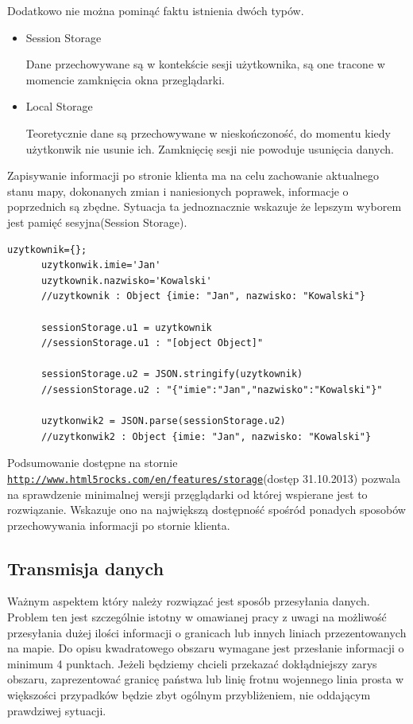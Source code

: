 Dodatkowo nie można pominąć faktu istnienia dwóch typów.
\begin{itemize}

\item
Session Storage

Dane przechowywane są w kontekście sesji użytkownika, są one tracone w momencie zamknięcia okna przeglądarki.

\item
Local Storage

Teoretycznie dane są przechowywane w nieskończoność, do momentu kiedy użytkonwik nie usunie ich. Zamknięcię sesji nie powoduje usunięcia danych.

\end{itemize}

Zapisywanie informacji po stronie klienta ma na celu zachowanie aktualnego stanu mapy, dokonanych zmian i naniesionych poprawek, informacje o poprzednich są zbędne. Sytuacja ta jednoznacznie wskazuje że lepszym wyborem jest pamięć sesyjna(Session Storage).

\lstset{language=JavaScript}
\label{lis:storage}
\begin{lstlisting}[caption=json]
      uzytkownik={};
      uzytkonwik.imie='Jan'
      uzytkownik.nazwisko='Kowalski'
      //uzytkownik : Object {imie: "Jan", nazwisko: "Kowalski"}

      sessionStorage.u1 = uzytkownik
      //sessionStorage.u1 : "[object Object]"

      sessionStorage.u2 = JSON.stringify(uzytkownik)
      //sessionStorage.u2 : "{"imie":"Jan","nazwisko":"Kowalski"}"

      uzytkonwik2 = JSON.parse(sessionStorage.u2)
      //uzytkonwik2 : Object {imie: "Jan", nazwisko: "Kowalski"}
\end{lstlisting}


Podsumowanie dostępne na stornie \underline{\texttt{http://www.html5rocks.com/en/features/storage}}(dostęp 31.10.2013) pozwala na sprawdzenie minimalnej wersji przęglądarki od której wspierane jest to rozwiązanie. Wskazuje ono na największą dostępność spośród ponadych sposobów przechowywania informacji po stornie klienta.

\subsection{Transmisja danych}
\label{subsec:transmisjaDanych}

Ważnym aspektem który należy rozwiązać jest sposób przesyłania danych. Problem ten jest szczególnie istotny w omawianej pracy z uwagi na możliwość przesyłania dużej ilości informacji o granicach lub innych liniach przezentowanych na mapie. Do opisu kwadratowego obszaru wymagane jest przesłanie informacji o minimum 4 punktach. Jeżeli będziemy chcieli przekazać dokłądniejszy zarys obszaru, zaprezentować granicę państwa lub linię frotnu wojennego linia prosta w większości przypadków będzie zbyt ogólnym przybliżeniem, nie oddającym prawdziwej sytuacji.

